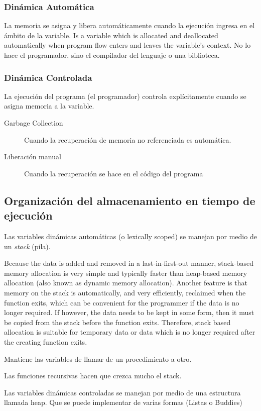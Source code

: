 \documentclass[a4paper, twoside]{article}
\begin{document}
\subsubsection{Dinámica Automática}
La memoria se asigna y libera automáticamente cuando la ejecución ingresa en el ámbito de la variable.
Is a variable which is allocated and deallocated automatically when program flow enters and leaves the variable's context. No lo hace el programador, sino el compilador del lenguaje o una biblioteca.

\subsubsection{Dinámica Controlada}
La ejecución del programa (el programador) controla explícitamente cuando se asigna memoria a la variable.
\begin{description}
	\item[Garbage Collection] Cuando la recuperación de memoria no referenciada es automática.
	\item[Liberación manual] Cuando la recuperación se hace en el código del programa
\end{description}

\subsection{Organización del almacenamiento en tiempo de ejecución}
Las variables dinámicas automáticas (o lexically scoped) se manejan por medio de un \emph{stack} (pila).

Because the data is added and removed in a last-in-first-out manner, stack-based memory allocation is very simple and typically faster than heap-based memory allocation (also known as dynamic memory allocation). Another feature is that memory on the stack is automatically, and very efficiently, reclaimed when the function exits, which can be convenient for the programmer if the data is no longer required. If however, the data needs to be kept in some form, then it must be copied from the stack before the function exits. Therefore, stack based allocation is suitable for temporary data or data which is no longer required after the creating function exits. 

Mantiene las variables de llamar de un procedimiento a otro.

Las funciones recursivas hacen que crezca mucho el stack.

Las variables dinámicas controladas se manejan por medio de una estructura llamada heap. Que se puede implementar de varias formas (Listas o Buddies)
\end{document}
